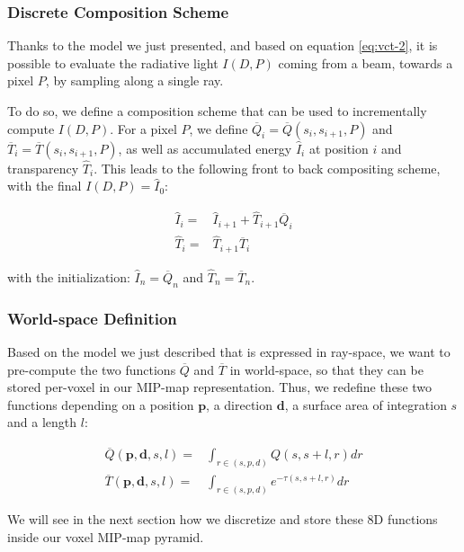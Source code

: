 \subsubsection{Discrete Composition Scheme}
Thanks to the model we just presented, and based on equation \ref{eq:vct-2}, it is possible to evaluate the radiative light $I(D,P)$ coming from a beam, towards a pixel $P$, by sampling along a single ray.

To do so, we define a composition scheme that can be used to incrementally compute $I(D,P)$. For a pixel $P$, we define $\overline{Q}_i=\overline{Q}(s_i,s_{i+1},P)$ and $\overline{T}_i=\overline{T}(s_i,s_{i+1},P)$, as well as accumulated energy $\hat{I}_i$ at position $i$ and transparency $\hat{T}_i$. This leads to the following front to back compositing scheme, with the final $I(D,P)=\hat{I}_0$:

\begin{equation*}
\begin{aligned}
	\hat{I}_i=&\hat{I}_{i+1}+\hat{T}_{i+1}\overline{Q}_i\\
	\hat{T}_i=&\hat{T}_{i+1}\overline{T}_i
\end{aligned}
\end{equation*}

with the initialization: $\hat{I}_n=\overline{Q}_n$ and $\hat{T}_n=\overline{T}_n$.




\subsubsection{World-space Definition}
Based on the model we just described that is expressed in ray-space, we want to pre-compute the two functions $\overline{Q}$ and $\overline{T}$ in world-space, so that they can be stored per-voxel in our MIP-map representation. Thus, we redefine these two functions depending on a position $\mathbf{p}$, a direction $\mathbf{d}$, a surface area of integration $s$ and a length $l$:

\begin{equation*}
	\begin{aligned}
		\overline{Q}(\mathbf{p},\mathbf{d},s,l)=&\int_{r\in (s,p,d)}Q(s,s+l,r)dr\\
		\overline{T}(\mathbf{p},\mathbf{d},s,l)=&\int_{r\in (s,p,d)}e^{-\tau(s,s+l,r)}dr
	\end{aligned}
\end{equation*} 

We will see in the next section how we discretize and store these 8D functions inside our voxel MIP-map pyramid. 




